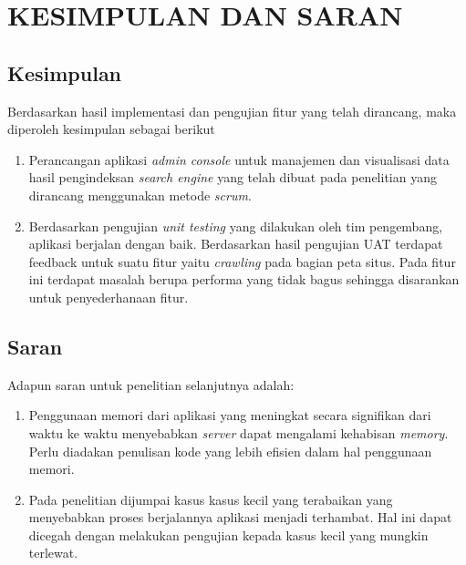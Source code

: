 
\chapter{KESIMPULAN DAN SARAN}

\section{Kesimpulan}
Berdasarkan hasil implementasi dan pengujian fitur yang telah dirancang, maka diperoleh kesimpulan sebagai berikut

\begin{enumerate}
	\item Perancangan aplikasi \textit{admin console} untuk manajemen dan visualisasi data hasil pengindeksan \textit{search engine} yang telah dibuat pada penelitian \citep{lazu} yang dirancang menggunakan metode \textit{scrum}.
	\item Berdasarkan pengujian \textit{unit testing} yang dilakukan oleh tim pengembang, aplikasi berjalan dengan baik. Berdasarkan hasil pengujian UAT terdapat feedback untuk suatu fitur yaitu \textit{crawling} pada bagian peta situs. Pada fitur ini terdapat masalah berupa performa yang tidak bagus sehingga disarankan untuk penyederhanaan fitur.
\end{enumerate}

\section{Saran}

Adapun saran untuk penelitian selanjutnya adalah:

\begin{enumerate}
	\item Penggunaan memori dari aplikasi yang meningkat secara signifikan dari waktu ke waktu menyebabkan \textit{server} dapat mengalami kehabisan \textit{memory}. Perlu diadakan penulisan kode yang lebih efisien dalam hal penggunaan memori.
	\item Pada penelitian dijumpai kasus kasus kecil yang terabaikan yang menyebabkan proses berjalannya aplikasi menjadi terhambat. Hal ini dapat dicegah dengan melakukan pengujian kepada kasus kecil yang mungkin terlewat.
\end{enumerate}


\begin{comment}

\end{comment}
